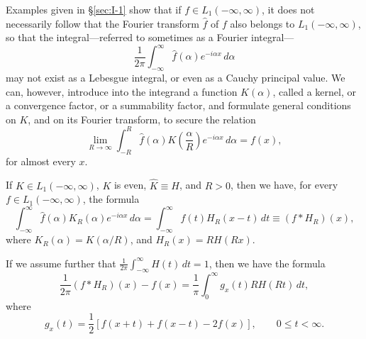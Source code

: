 Examples given in \S\ref{sec:I-1} show that if $f\in L_1(-\infty,\infty)$, it does not necessarily follow that the Fourier transform $\hat f$ of $f$ also belongs to $L_1(-\infty,\infty)$, so that the integral---referred to sometimes as a Fourier integral---
\begin{equation*}
\frac{1}{2\pi}\int_{-\infty}^{\infty}\hat f(\alpha)e^{-i\alpha x}\,d\alpha
\end{equation*}
may not exist as a Lebesgue integral, or even as a Cauchy principal value. We can, however, introduce into the integrand a function $K(\alpha)$, called a kernel, or a convergence factor, or a summability factor, and formulate general conditions on $K$, and on its Fourier transform, to secure the relation
\begin{equation*}
\lim_{R\to\infty}\int_{-R}^{R}\hat f(\alpha)K\!\left(\frac{\alpha}{R}\right)e^{-i\alpha x}\,d\alpha=f(x),
\end{equation*}
for almost every $x$.

\begin{theorem}\label{thm:I-8}
If $K\in L_1(-\infty,\infty)$, $K$ is even, $\hat K\equiv H$, and $R>0$, then we have, for every $f\in L_1(-\infty,\infty)$, the formula
\begin{equation}\label{eq:I-7.1}
\int_{-\infty}^{\infty}\hat f(\alpha)K_R(\alpha)e^{-i\alpha x}\,d\alpha
=\int_{-\infty}^{\infty}f(t)H_R(x-t)\,dt
\equiv(f*H_R)(x),
\end{equation}
where $K_R(\alpha)=K(\alpha/R)$, and $H_R(x)=RH(Rx)$.

If we assume further that $\frac{1}{2\pi}\int_{-\infty}^{\infty}H(t)\,dt=1$, then we have the formula
\begin{equation}\label{eq:I-7.2}
\frac{1}{2\pi}(f*H_R)(x)-f(x)
=\frac{1}{\pi}\int_0^\infty g_x(t)RH(Rt)\,dt,
\end{equation}
where
\begin{equation}\label{eq:I-7.3}
g_x(t)=\frac12[f(x+t)+f(x-t)-2f(x)],\qquad 0\le t<\infty.
\end{equation}
\end{theorem}

